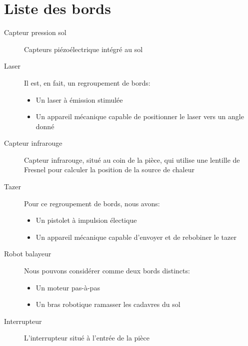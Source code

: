 \section {Liste des bords}

\begin{description}
	
	\item [Capteur pression sol]\el
		Capteurs piézoélectrique intégré au sol

	\item [Laser]\el
		Il est, en fait, un regroupement de bords:
		\begin{itemize}
		\item Un laser à émission stimulée
		\item Un appareil mécanique capable de positionner le laser
		vers un angle donné
		\end{itemize}
	
	\item [Capteur infrarouge]\el
		Capteur infrarouge, situé au coin de la pièce, qui utilise une
		lentille de Fresnel pour calculer la position de la source de chaleur
	
	\item [Tazer]\el	
		Pour ce regroupement de bords, nous avons:
		\begin{itemize}
		\item Un pistolet à impulsion électique
		\item Un appareil mécanique capable d'envoyer et de 
			rebobiner le tazer
		\end{itemize}
	
	\item [Robot balayeur]\el
		Nous pouvons considérer comme deux bords distincts:
		\begin{itemize}
		\item Un moteur pas-à-pas
		\item Un bras robotique ramasser les cadavres du sol
		\end{itemize}

	\item [Interrupteur]\el
		L'interrupteur situé à l'entrée de la pièce

\end{description}

\vfill
\pagebreak

